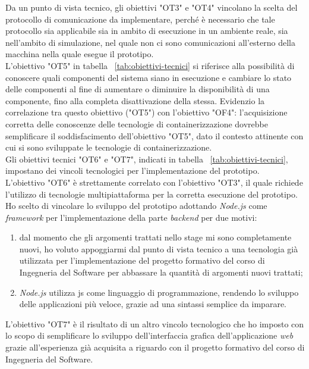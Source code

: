 Da un punto di vista tecnico, gli obiettivi "OT3" e "OT4" vincolano la scelta del protocollo di comunicazione da implementare, perché è necessario che tale protocollo sia applicabile sia in ambito di esecuzione in un ambiente reale, sia nell'ambito di simulazione, nel quale non ci sono comunicazioni all'esterno della macchina nella quale esegue il prototipo. \\
L'obiettivo "OT5" in tabella ~\ref{tab:obiettivi-tecnici} si riferisce alla possibilità di conoscere quali componenti del sistema siano in esecuzione e cambiare lo stato delle componenti al fine di aumentare o diminuire la disponibilità di una componente, fino alla completa disattivazione della stessa. Evidenzio la correlazione tra questo obiettivo ("OT5") con l'obiettivo "OF4": l'acquisizione corretta delle conoscenze delle tecnologie di containerizzazione dovrebbe semplificare il soddisfacimento dell'obiettivo "OT5", dato il contesto attinente con cui si sono sviluppate le tecnologie di containerizzazione. \\

Gli obiettivi tecnici "OT6" e "OT7", indicati in tabella ~\ref{tab:obiettivi-tecnici}, impostano dei vincoli tecnologici per l'implementazione del prototipo. \\
L'obiettivo "OT6" è strettamente correlato con l'obiettivo "OT3", il quale richiede l'utilizzo di tecnologie multipiattaforma per la corretta esecuzione del prototipo. Ho scelto di vincolare lo sviluppo del prototipo adottando \emph{Node.js} come \emph{framework} per l'implementazione della parte \emph{backend} per due motivi:
\begin{enumerate}
  \item dal momento che gli argomenti trattati nello stage mi sono completamente nuovi, ho voluto appoggiarmi dal punto di vista tecnico a una tecnologia già utilizzata per l'implementazione del progetto formativo del corso di Ingegneria del Software per abbassare la quantità di argomenti nuovi trattati;
  \item \emph{Node.js} utilizza \gls{js} come linguaggio di programmazione, rendendo lo sviluppo delle applicazioni più veloce, grazie ad una sintassi semplice da imparare.
\end{enumerate}
L'obiettivo "OT7" è il risultato di un altro vincolo tecnologico che ho imposto con lo scopo di semplificare lo sviluppo dell'interfaccia grafica dell'applicazione \emph{web} grazie all'esperienza già acquisita a riguardo con il progetto formativo del corso di Ingegneria del Software.

